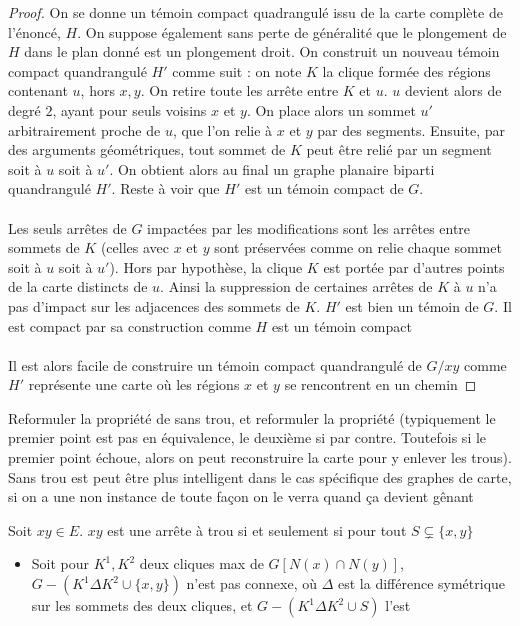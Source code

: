 \documentclass{scrartcl}
\begin{document}
\begin{flushleft}
\begin{proof}
    On se donne un témoin compact quadrangulé issu de la carte complète de l'énoncé, $H$. On suppose également sans perte de généralité que le plongement
    de $H$ dans le plan donné est un plongement droit. On construit un nouveau témoin compact quandrangulé
    $H'$ comme suit : on note $K$ la clique formée des régions contenant $u$, hors $x, y$. On retire toute les arrête entre $K$ et $u$.
    $u$ devient alors de degré $2$, ayant pour seuls voisins $x$ et $y$. On place alors un sommet $u'$ arbitrairement proche de $u$, que l'on
    relie à $x$ et $y$ par des segments. Ensuite, par des arguments géométriques, tout sommet de $K$ peut être relié par un segment soit à
    $u$ soit à $u'$. On obtient alors au final un graphe planaire biparti quandrangulé $H'$. Reste à voir que $H'$ est un témoin compact de $G$.
    \\~\\
    Les seuls arrêtes de $G$ impactées par les modifications sont les arrêtes entre sommets de $K$ (celles avec $x$ et $y$ sont préservées
    comme on relie chaque sommet soit à $u$ soit à $u'$). Hors par hypothèse, la clique $K$ est portée par d'autres points de la carte distincts
    de $u$. Ainsi la suppression de certaines arrêtes de $K$ à $u$ n'a pas d'impact sur les adjacences des sommets de $K$. $H'$ est bien un témoin
    de $G$. Il est compact par sa construction comme $H$ est un témoin compact
    \\~\\
    Il est alors facile de construire un témoin compact quandrangulé de $G / xy$ comme $H'$ représente une carte où les régions $x$ et $y$
    se rencontrent en un chemin
\end{proof}

Reformuler la propriété de sans trou, et reformuler la propriété (typiquement le premier point est pas en équivalence, le deuxième si
par contre. Toutefois si le premier point échoue, alors on peut reconstruire la carte pour y enlever les trous). Sans trou est peut être
plus intelligent dans le cas spécifique des graphes de carte, si on a une non instance de toute façon on le verra quand ça devient gênant

\begin{prop}
    Soit $xy \in E$. $xy$ est une arrête à trou si et seulement si pour tout $S \subsetneq \{x, y\}$
    \begin{itemize}
        \item Soit pour $K^1, K^2$ deux cliques max de $G[N(x) \cap N(y)]$, $G - (K^1 \Delta K^2 \cup \{x,y\})$ n'est pas connexe,
        où $\Delta$ est la différence symétrique sur les sommets des deux cliques, et $G - (K^1 \Delta K^2 \cup S)$ l'est
    \end{itemize} 
    

\end{prop}
\end{flushleft}
\end{document}

